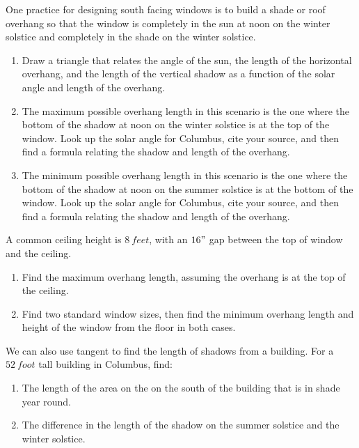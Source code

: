 \documentclass[noauthor,nooutcomes,handout,hints]{../ximera}
\begin{document}
\mynewpage


\begin{question}
 One practice for designing south facing windows is to build a shade or roof overhang so that the window is completely in the sun at noon on the winter solstice and completely in the shade on the winter solstice. 
 
\begin{enumerate}
\item Draw a triangle that relates the angle of the sun, the length of the horizontal overhang, and the length of the vertical shadow as a function of the solar angle and length of the overhang.
\item The maximum possible overhang length in this scenario is the one where the bottom of the shadow at noon on the winter solstice is at the top of the window. Look up the solar angle for Columbus, cite your source, and then find a formula relating the shadow and length of the overhang.
\item The minimum possible overhang length in this scenario is the one where the bottom of the shadow at noon on the summer solstice is at the bottom of the window. Look up the solar angle for Columbus, cite your source, and then find a formula relating the shadow and length of the overhang.
\end{enumerate}
\end{question}
\mynewpage


\begin{question}
 A common ceiling height is $8\ feet$, with an $16"$ gap between the top of window and the ceiling. 
 
\begin{enumerate}
 \item Find the maximum overhang length, assuming the overhang is at the top of the ceiling.
 \item Find two standard window sizes, then find the minimum overhang length and height of the window from the floor in both cases.
\end{enumerate}
\end{question}
\mynewpage

\begin{question}
 We can also use tangent to find the length of shadows from a building. For a $52\ foot$ tall building in Columbus, find:
 
\begin{enumerate}
 \item The length of the area on the on the south of the building that is in shade year round.
 \item The difference in the length of the shadow on the summer solstice and the winter solstice.
\end{enumerate}
\end{question}
\end{document}
